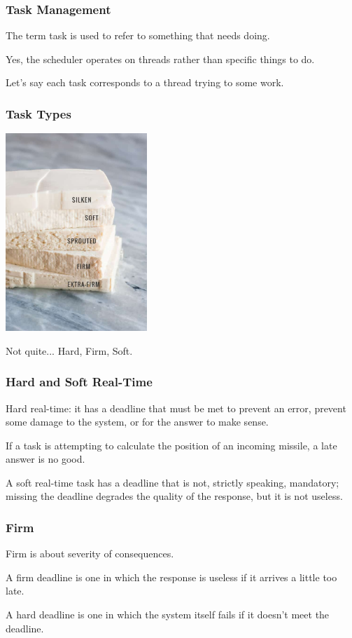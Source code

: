 \begin{frame}
\frametitle{Task Management}

The term \alert{task} is used to refer to something that needs doing.

Yes, the scheduler operates on threads rather than specific things to do.

Let's say each task corresponds to a thread trying to some work.

\end{frame}

\begin{frame}
\frametitle{Task Types}

\begin{center}
	\includegraphics[width=0.4\textwidth]{images/tofu.jpg}
\end{center}

Not quite... Hard, Firm, Soft.

\end{frame}

\begin{frame}
\frametitle{Hard and Soft Real-Time}

\alert{Hard real-time}: it has a deadline that must be met to prevent an error, prevent some damage to the system, or for the answer to make sense. 

If a task is attempting to calculate the position of an incoming missile, a late answer is no good. 

A \alert{soft real-time} task has a deadline that is not, strictly speaking, mandatory; missing the deadline degrades the quality of the response, but it is not useless.

\end{frame}

\begin{frame}
\frametitle{Firm}

Firm is about severity of consequences. 

A firm deadline is one in which the response is useless if it arrives a little too late.

A hard deadline is one in which the system itself fails if it doesn't meet the deadline.
\end{frame}

